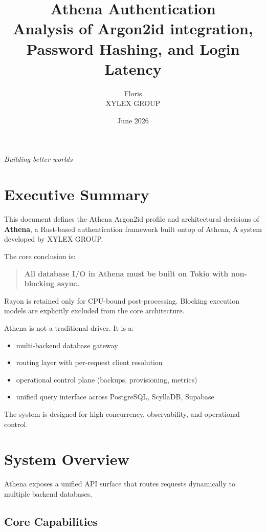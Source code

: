 \documentclass[11pt,a4paper]{article}
\title{Athena Authentication \\ \large Analysis of Argon2id integration, Password Hashing, and Login Latency}
\author{Floris \\ XYLEX GROUP}
\date{June 2026}
\begin{document}
\maketitle

\begin{center}
\textit{Building better worlds}
\end{center}

\tableofcontents
\newpage

\section{Executive Summary}

This document defines the Athena Argon2id profile and architectural decisions of \textbf{Athena}, a Rust-based authentication framework built ontop of Athena, A system developed by XYLEX GROUP.

The core conclusion is:

\begin{quote}
\textbf{All database I/O in Athena must be built on Tokio with non-blocking async.}
\end{quote}

Rayon is retained only for CPU-bound post-processing. Blocking execution models are explicitly excluded from the core architecture.

Athena is not a traditional driver. It is a:

\begin{itemize}
\item multi-backend database gateway
\item routing layer with per-request client resolution
\item operational control plane (backups, provisioning, metrics)
\item unified query interface across PostgreSQL, ScyllaDB, Supabase
\end{itemize}

The system is designed for high concurrency, observability, and operational control.

\newpage

\section{System Overview}

Athena exposes a unified API surface that routes requests dynamically to multiple backend databases.

\subsection{Core Capabilities}
\end{document}
